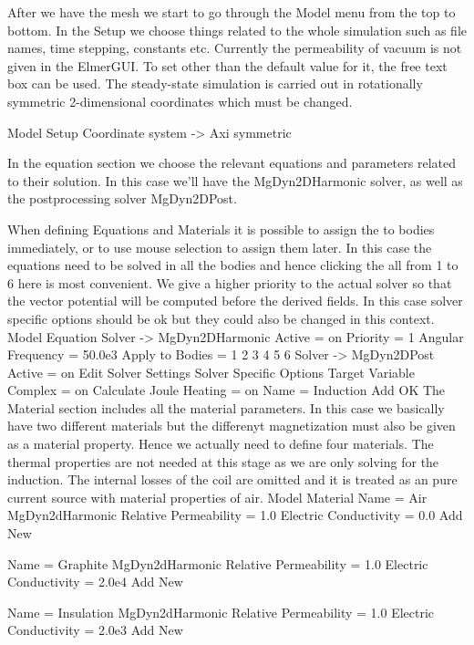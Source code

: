 After we have the mesh we start to go through the Model menu from the top to bottom. 
In the Setup we choose things related to the whole simulation such as file names, 
time stepping, constants etc.
Currently the permeability of vacuum is not given
in the ElmerGUI. To set other than the default value for it, the free text box can be used. 
The steady-state simulation is carried out in rotationally symmetric 2-dimensional 
coordinates which must be changed.

\ttbegin
Model
  Setup  
    Coordinate system -> Axi symmetric
\ttend
 
In the equation section we choose the relevant equations and parameters related to their solution. 
In this case we'll have the MgDyn2DHarmonic solver, as well as the postprocessing solver MgDyn2DPost.

When defining Equations and Materials it is possible to assign the to bodies immediately, or to use mouse
selection to assign them later. In this case the equations need to be solved in all the bodies and 
hence clicking the all from 1 to 6 here is most convenient. We give a higher priority to the actual solver
so that the vector potential will be computed before the derived fields. 
In this case solver specific options should be ok but they could also be changed in this context.
\ttbegin
Model
  Equation
	Solver -> MgDyn2DHarmonic
      Active = on
      Priority = 1
      Angular Frequency = 50.0e3
      Apply to Bodies = 1 2 3 4 5 6
    Solver -> MgDyn2DPost
      Active = on
      Edit Solver Settings
        Solver Specific Options
          Target Variable Complex = on
          Calculate Joule Heating = on
    Name = Induction
    Add 
    OK
\ttend        
The Material section includes all the material parameters. In this case we basically have two 
different materials but the differenyt magnetization must also be given as a material property.
Hence we actually need to define four materials. The thermal properties are not needed at this stage as 
we are only solving for the induction. The internal losses of the coil are omitted and it is treated as an
pure current source with material properties of air.  
\ttbegin
Model
  Material
    Name = Air
    MgDyn2dHarmonic
      Relative Permeability = 1.0
      Electric Conductivity = 0.0
    Add
    New
	
    Name = Graphite
    MgDyn2dHarmonic
      Relative Permeability = 1.0
      Electric Conductivity = 2.0e4
    Add
    New

    Name = Insulation
    MgDyn2dHarmonic
      Relative Permeability = 1.0
      Electric Conductivity = 2.0e3
    Add
    New

